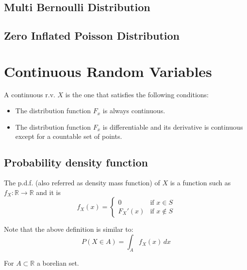 \subsection{Multi Bernoulli Distribution} %
\label{sub:multi_bernoulli_distribution}


\subsection{Zero Inflated Poisson Distribution} %
\label{sub:zero_inflated_poisson_distribution}


\section{Continuous Random Variables} %
\label{sec:continuous_random_variables}

A continuous r.v. $X$ is the one that satisfies the following conditions:
\begin{itemize}
    \item The distribution function $F_x$ is always continuous.
    \item The distribution function $F_x$ is differentiable and its derivative
    is continuous except for a countable set of points.
\end{itemize}

\subsection{Probability density function} %
\label{sub:probability_density_function}

The p.d.f. (also referred as density mass function) of $X$ is a function such as
$f_X:\mathbb{R}\rightarrow\mathbb{R}$ and it is 
\begin{equation*}
    f_X(x)=\begin{cases}
          0& \text{if }x\in S\\
    F_X'(x)& \text{if }x\notin S
    \end{cases} 
\end{equation*}

\begin{tcolorbox}
    Note that the above definition is similar to:
    \begin{equation*}
        P(X\in A) = \int_A f_X(x)\,dx
    \end{equation*}
    
    For $A\subset\mathbb{R}$ a borelian set.
\end{tcolorbox}

